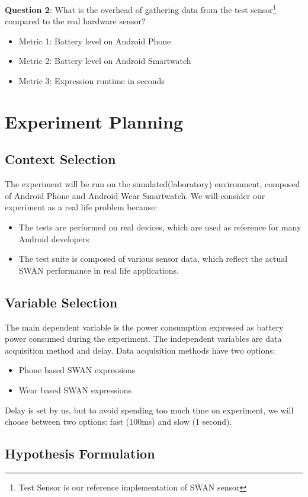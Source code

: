 \textbf{Question 2}:  What is the overhead of gathering data from the test sensor\footnote{Test Sensor is our reference implementation of SWAN sensor} compared to the real hardware sensor?
\begin{itemize}
 \item Metric 1:  Battery level on Android Phone
 \item Metric 2: Battery level on Android Smartwatch
 \item  Metric 3:  Expression runtime in seconds
\end{itemize}

\section{Experiment Planning}
\subsection{Context Selection}
The experiment will be run on the simulated(laboratory) environment, composed of Android Phone and Android Wear Smartwatch. We will consider our experiment as a real life problem because:
\begin{itemize}
 \item The tests are performed on real devices, which are used as reference for many Android developers
 \item The test suite is composed of various sensor data, which reflect the actual SWAN performance in real life applications.
\end{itemize}

\subsection{Variable Selection}

The main dependent variable is the power consumption expressed as battery power consumed during the experiment.
The independent variables are data acquisition method and delay.
Data acquisition methods  have two options:
\begin{itemize}
 \item Phone based SWAN expressions
 \item Wear based SWAN expressions
\end{itemize}

Delay is set by us, but to avoid spending too much time on experiment, we will choose between two options: fast (100ms) and slow (1 second).

\subsection{ Hypothesis Formulation}


